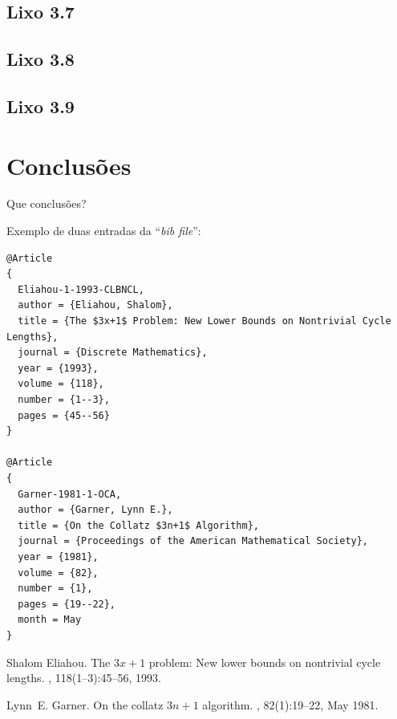 \documentclass[11pt,twoside,a4paper]{report}
\begin{document}
\section{Lixo 3.7}

\section{Lixo 3.8}

\section{Lixo 3.9}


\cleardoublepage
\chapter{Conclus\~ oes}

Que conclus\~oes?

Exemplo de duas entradas da ``\textit{bib file}'':

{\footnotesize
\begin{verbatim}
@Article
{
  Eliahou-1-1993-CLBNCL,
  author = {Eliahou, Shalom},
  title = {The $3x+1$ Problem: New Lower Bounds on Nontrivial Cycle Lengths},
  journal = {Discrete Mathematics},
  year = {1993},
  volume = {118},
  number = {1--3},
  pages = {45--56}
}

@Article
{
  Garner-1981-1-OCA,
  author = {Garner, Lynn E.},
  title = {On the Collatz $3n+1$ Algorithm},
  journal = {Proceedings of the American Mathematical Society},
  year = {1981},
  volume = {82},
  number = {1},
  pages = {19--22},
  month = May
}
\end{verbatim}
}


%
%
\cleardoublepage
\iffalse
  
\else
  \begin{thebibliography}{10}

  Shalom Eliahou.
  \newblock The $3x+1$ problem: New lower bounds on nontrivial cycle lengths.
  , 118(1--3):45--56, 1993.

  Lynn~E. Garner.
  \newblock On the collatz $3n+1$ algorithm.
  , 82(1):19--22,
    May 1981.
  \end{thebibliography}
\fi
\cleardoublepage
\end{document}
